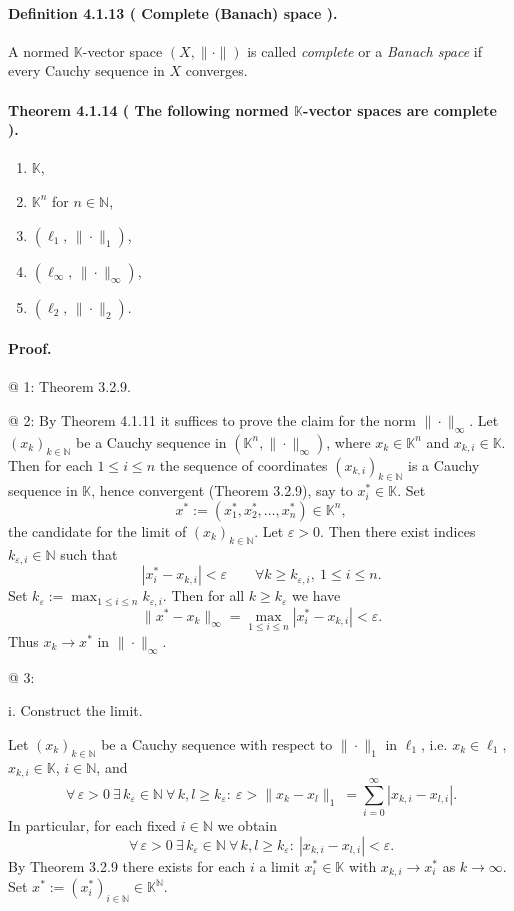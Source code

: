 \documentclass[12pt,a4paper]{article}
\newcommand{\N}{\mathbb{N}}
\newcommand{\K}{\mathbb{K}} %
\newcommand{\eps}{\varepsilon}
\newcommand{\NumberedDefinition}[3]{%
\paragraph*{Definition #1 ( #2 ).} #3\par}
\newcommand{\NumberedTheorem}[3]{%
\paragraph*{Theorem #1 ( #2 ).} #3\par}
\theoremstyle{plain}
\theoremstyle{definition}
\theoremstyle{remark}
\begin{document}
	\NumberedDefinition{4.1.13}{Complete (Banach) space}{A normed $\K$-vector space $(X,\|\cdot\|)$ is called \emph{complete} or a \emph{Banach space} if every Cauchy sequence in $X$ converges.}

	\NumberedTheorem{4.1.14}{The following normed $\K$-vector spaces are complete}{\begin{enumerate}[label={(\arabic*)}, leftmargin=*]
		\item $\K$,
		\item $\K^{n}$ for $n\in\N$,
		\item $(\ell_{1},\,\|\cdot\|_{1})$,
		\item $(\ell_{\infty},\,\|\cdot\|_{\infty})$,
		\item $(\ell_{2},\,\|\cdot\|_{2})$.
\end{enumerate}}

\paragraph{Proof.}
@ 1: Theorem 3.2.9.

@ 2: By Theorem 4.1.11 it suffices to prove the claim for the norm $\|\cdot\|_\infty$. Let $(x_k)_{k\in\N}$ be a Cauchy sequence in $(\K^{n},\|\cdot\|_{\infty})$, where $x_k\in\K^n$ and $x_{k,i}\in\K$. Then for each $1\le i\le n$ the sequence of coordinates $(x_{k,i})_{k\in\N}$ is a Cauchy sequence in $\K$, hence convergent (Theorem 3.2.9), say to $x_i^{\ast}\in\K$. Set
\[
	\ x^{\ast} := (x_1^{\ast},x_2^{\ast},\dots,x_n^{\ast}) \in \K^{n},
\]
the candidate for the limit of $(x_k)_{k\in\N}$. Let $\eps>0$. Then there exist indices $k_{\eps,i}\in\N$ such that
\[
	\ |x_i^{\ast}-x_{k,i}| < \eps \qquad \forall k\ge k_{\eps,i},\ 1\le i\le n.
\]
Set $k_{\eps} := \max_{1\le i\le n} k_{\eps,i}$. Then for all $k\ge k_{\eps}$ we have
\[
	\ \|x^{\ast}-x_k\|_{\infty} 
		 = \max_{1\le i\le n} |x_i^{\ast}-x_{k,i}| 
		 < \eps.
\]
Thus $x_k\to x^{\ast}$ in $\|\cdot\|_{\infty}$.

@ 3:

i. Construct the limit.

Let $(x_k)_{k\in\N}$ be a Cauchy sequence with respect to $\|\cdot\|_{1}$ in $\ell_{1}$, i.e. $x_k\in\ell_{1}$, $x_{k,i}\in\K$, $i\in\N$, and
\[
	\ \forall\,\eps>0\ \exists\,k_{\eps}\in\N\ \forall\,k,l\ge k_{\eps} :\ \eps > \|x_k-x_l\|_{1} 
		\ = \sum_{i=0}^{\infty} |x_{k,i}-x_{l,i}|.
\]
In particular, for each fixed $i\in\N$ we obtain
\[
	\ \forall\,\eps>0\ \exists\,k_{\eps}\in\N\ \forall\,k,l\ge k_{\eps} :\ |x_{k,i}-x_{l,i}|<\eps.
\]
By Theorem 3.2.9 there exists for each $i$ a limit $x_i^{\ast}\in\K$ with $x_{k,i}\to x_i^{\ast}$ as $k\to\infty$. Set $x^{\ast}:=(x_i^{\ast})_{i\in\N}\in\K^{\N}$.
\end{document}
